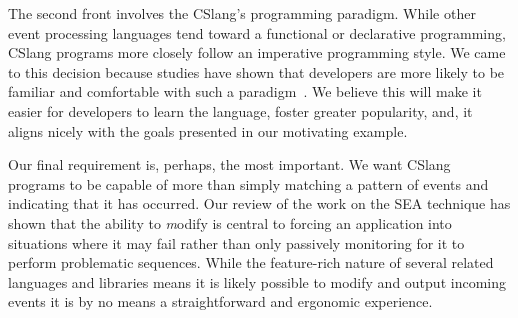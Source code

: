 The second front involves the CSlang's programming paradigm.
While other event processing languages tend toward a functional or
declarative programming,
CSlang programs more closely follow an imperative programming style.
We came to this decision because studies
have shown that developers are more likely to be familiar and comfortable
with such a paradigm~\cite{XXXX}.  We believe this will make it easier for
developers to learn the language, foster greater popularity, and, it aligns
nicely with the goals presented in our motivating example.

Our final requirement is, perhaps, the most important.
We want CSlang programs to be capable of more than simply matching
a pattern of events and indicating that it has occurred.
Our review of the work on the SEA technique has shown that the ability to
{\textit modify} is central to forcing an application into situations where
it may fail rather than only passively monitoring for it to perform
problematic sequences.  While the feature-rich nature of several related
languages and libraries means it is likely possible to modify and output
incoming events it is by no means a straightforward and ergonomic experience.

